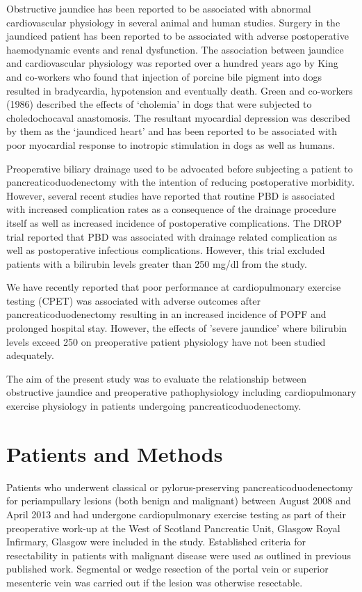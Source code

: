 Obstructive jaundice has been reported to be associated with abnormal cardiovascular physiology in several animal and human studies. Surgery in the jaundiced patient has been reported to be associated with adverse postoperative haemodynamic events and renal dysfunction.\parencite{pain_perioperative_1985,green_systemic_1995} The association between jaundice and cardiovascular physiology was reported over a hundred years ago by King and co-workers who found that injection of porcine bile pigment into dogs resulted in bradycardia, hypotension and eventually death.\parencite{king_effect_1909} Green and co-workers (1986) described the effects of ‘cholemia' in dogs that were subjected to choledochocaval anastomosis. The resultant myocardial depression was described by them as the ‘jaundiced heart'\parencite{green_jaundiced_1986} and has been reported to be associated with poor myocardial response to inotropic stimulation in dogs\parencite{binah_obstructive_1985, bomzon_systemic_1986} as well as humans.\parencite{lumlertgul_jaundiced_1991}

Preoperative biliary drainage used to be advocated before subjecting a patient to pancreaticoduodenectomy with the intention of reducing postoperative morbidity. However, several recent studies have reported that routine PBD is associated with increased complication rates as a consequence of the drainage procedure itself as well as increased incidence of postoperative complications. The DROP trial reported that PBD was associated with drainage related complication as well as postoperative infectious complications. However, this trial excluded patients with a bilirubin levels greater than 250 mg/dl from the study. 

We have recently reported that poor performance at cardiopulmonary exercise testing (CPET) was associated with adverse outcomes after pancreaticoduodenectomy resulting in an increased incidence of POPF and prolonged hospital stay. However, the effects of 'severe jaundice' where bilirubin levels exceed 250 on preoperative patient physiology have not been studied adequately. 

The aim of the present study was to evaluate the relationship between obstructive jaundice and preoperative pathophysiology including cardiopulmonary exercise physiology in patients undergoing pancreaticoduodenectomy.

\clearpage

\section{Patients and Methods}
Patients who underwent classical or pylorus-preserving pancreaticoduodenectomy for periampullary lesions (both benign and malignant) between August 2008 and April 2013 and had undergone cardiopulmonary exercise testing as part of their preoperative work-up at the West of Scotland Pancreatic Unit, Glasgow Royal Infirmary, Glasgow were included in the study. Established criteria for resectability in patients with malignant disease were used as outlined in previous published work. Segmental or wedge resection of the portal vein or superior mesenteric vein was carried out if the lesion was otherwise resectable.


